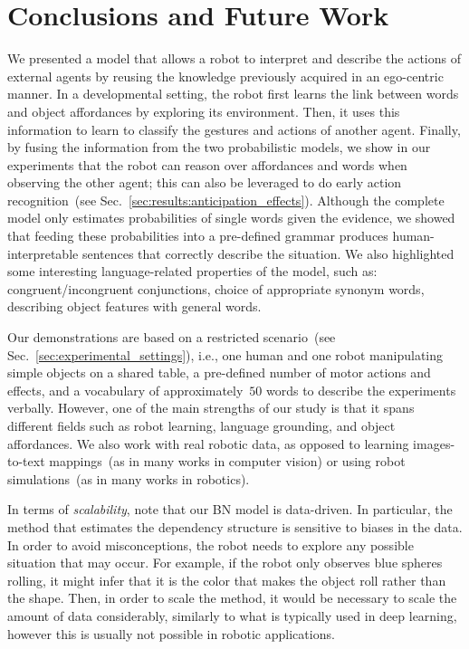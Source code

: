 
\section{Conclusions and Future Work}
\label{sec:conclusions}

We presented a model that allows a robot to interpret and describe the actions of external agents by reusing the knowledge previously acquired in an ego-centric manner.
In a developmental setting, the robot first learns the link between words and object affordances by exploring its environment.
Then, it uses this information to learn to classify the gestures and actions of another agent.
Finally, by fusing the information from the two probabilistic models, we show in our experiments that the robot can reason over affordances and words when observing the other agent; this can also be leveraged to do early action recognition~(see Sec.~\ref{sec:results:anticipation_effects}).
Although the complete model only estimates probabilities of single words given the evidence, we showed that feeding these probabilities into a pre-defined grammar produces human-interpretable sentences that correctly describe the situation.
We also highlighted some interesting language-related properties of the model, such as:
congruent/incongruent conjunctions,
choice of appropriate synonym words,
describing object features with general words.

Our demonstrations are based on a restricted scenario~(see Sec.~\ref{sec:experimental_settings}), i.e., one human and one robot manipulating simple objects on a shared table, a pre-defined number of motor actions and effects, and a vocabulary of approximately~$50$ words to describe the experiments verbally.
However, one of the main strengths of our study is that it spans different fields such as robot learning, language grounding, and object affordances.
We also work with real robotic data, as opposed to learning images-to-text mappings~(as in many works in computer vision) or using robot simulations~(as in many works in robotics).

In terms of \emph{scalability}, note that our \ac{BN} model is data-driven.
In particular, the method that estimates the dependency structure is sensitive to biases in the data.
In order to avoid misconceptions, the robot needs to explore any possible situation that may occur.
For example, if the robot only observes blue spheres rolling, it might infer that it is the color that makes the object roll rather than the shape.
Then, in order to scale the method, it would be necessary to scale the amount of data considerably, similarly to what is typically used in deep learning, however this is usually not possible in robotic applications.

